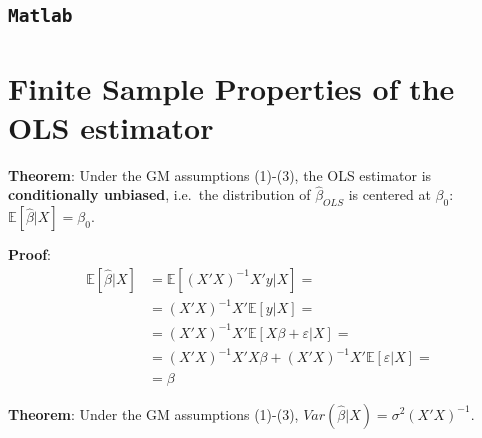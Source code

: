 \documentclass[12pt,]{book}
\newenvironment{Shaded}{\begin{snugshade}}{\end{snugshade}}
\newcommand{\CommentTok}[1]{\textcolor[rgb]{0.56,0.35,0.01}{\textit{#1}}}
\newcommand{\FloatTok}[1]{\textcolor[rgb]{0.00,0.00,0.81}{#1}}
\newcommand{\NormalTok}[1]{#1}
\begin{document}
\hypertarget{matlab-2}{%
\subsection{\texorpdfstring{\texttt{Matlab}}{Matlab}}\label{matlab-2}}

\begin{Shaded}
\end{Shaded}

\hypertarget{finite-sample-properties-of-the-ols-estimator}{%
\section{Finite Sample Properties of the OLS estimator}\label{finite-sample-properties-of-the-ols-estimator}}

\textbf{Theorem}:
Under the GM assumptions (1)-(3), the OLS estimator is \textbf{conditionally unbiased}, i.e.~the distribution of \(\hat \beta _ {OLS}\) is centered at \(\beta_0\): \(\mathbb E [\hat \beta | X] = \beta_0\).

\textbf{Proof}:
\[
\begin{aligned}
    \mathbb E [\hat \beta  | X] &= \mathbb E [ (X'X)^{-1} X'y | X] = \\
    &= (X'X)^{-1} X ' \mathbb E  [y | X] = \\
    &= (X'X)^{-1} X' \mathbb E  [X \beta + \varepsilon | X] = \\
    &= (X'X)^{-1} X'X \beta + (X'X)^{-1} X' \mathbb E  [\varepsilon | X] = \\
    &= \beta 
\end{aligned}
\]
\[\tag*{$\blacksquare$}\]

\textbf{Theorem}:
Under the GM assumptions (1)-(3), \(Var(\hat \beta |X) = \sigma^2 (X'X)^{-1}\).
\end{document}
